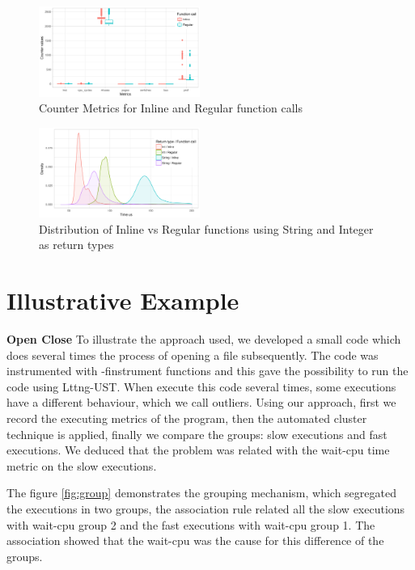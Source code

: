     \begin{figure}[h]
      \centering
        \includegraphics[width=0.47\textwidth]{figures/boxplots-inline-vs-regular.png}
        \caption{Counter Metrics for Inline and Regular function calls}
        \label{fig:notinline}
    \end{figure}
    
    \begin{figure}[h]
      \centering
        \includegraphics[width=0.47\textwidth]{figures/density-inline-vs-regular.png}
        \caption{Distribution of Inline vs Regular functions using String and Integer as return types}
        \label{fig:inline}
    \end{figure}
    
    
    \section{Illustrative Example}
    
\textbf{Open Close}
    To illustrate the approach used, we developed a small code which does several times the process of opening a file subsequently. The code was instrumented with -finstrument functions and this gave the possibility to run the code using Lttng-UST.
    When execute this code several times, some executions have a different behaviour, which we call outliers.
    Using our approach, first we record the executing metrics of the program, then the automated cluster technique is applied, finally we compare the groups: slow executions and fast executions. We deduced that the problem was related with the wait-cpu time metric on the slow executions.
    
    The figure \ref{fig:group} demonstrates the grouping mechanism, which segregated the executions in two groups, the association rule related all the slow executions with wait-cpu group 2 and the fast executions with wait-cpu group 1. The association showed that the wait-cpu was the cause for this difference of the groups.
    
